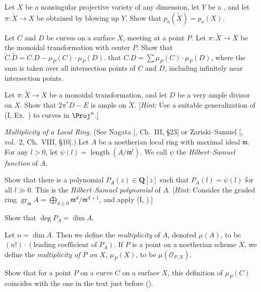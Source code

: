 {\Exercises
{\fontsize{9}{10.0}\selectfont\setlength{\parskip}{0pt}
\begin{description}[style=multiline,labelwidth=1.8em,leftmargin=2.15em,itemsep=3pt,topsep=0pt,parsep=0pt]
\item[\hypertarget{ex-V-3.1}{}3.1.] Let $X$ be a nonsingular projective variety of any dimension, let $Y$ be a , and let $\pi\colon\widetilde X\to X$ be obtained by blowing up $Y$. Show that $p_a(\widetilde X)=p_a(X)$.
\item[\hypertarget{ex-V-3.2}{}3.2.] Let $C$ and $D$ be curves on a surface $X$, meeting at a point $P$. Let $\pi\colon\widetilde X\to X$ be the monoidal transformation with center $P$. Show that $\widetilde C.\widetilde D=C.D-\mu_P(C)\cdot\mu_P(D)$.  that $C.D=\sum\mu_P(C)\cdot\mu_P(D)$, where the sum is taken over all intersection points of $C$ and $D$, including infinitely near intersection points.
\item[\hypertarget{ex-V-3.3}{}3.3.] Let $\pi\colon\widetilde X\to X$ be a monoidal transformation, and let $D$ be a very ample divisor on $X$. Show that $2\pi^*D-E$ is ample on $\widetilde X$. [\emph{Hint:} Use a suitable generalization of (I, Ex.~) to curves in $\Proj^n$.]
\item[\hypertarget{ex-V-3.4}{}3.4.] \emph{Multiplicity of a Local Ring.} (See Nagata [, Ch.~III, \S23] or Zariski--Samuel [, vol.~2, Ch.~VIII, \S10].) Let $A$ be a noetherian local ring with maximal ideal $\mathfrak m$. For any $l>0$, let $\psi(l)=\operatorname{length}(A/\mathfrak m^l)$. We call $\psi$ the \emph{Hilbert--Samuel function} of $A$.
\begin{parts}
\item Show that there is a polynomial $P_A(z)\in\mathbf Q[z]$ such that $P_A(l)=\psi(l)$ for all $l\gg0$. This is the \emph{Hilbert--Samuel polynomial} of $A$. [\emph{Hint:} Consider the graded ring $\operatorname{gr}_{\mathfrak m}A=\bigoplus_{d\ge0}\mathfrak m^d/\mathfrak m^{d+1}$, and apply (I, ).]
\item Show that $\deg P_A=\dim A$.
\item Let $n=\dim A$. Then we define the \emph{multiplicity} of $A$, denoted $\mu(A)$, to be $(n!)\cdot(\text{leading coefficient of }P_A)$. If $P$ is a point on a noetherian scheme $X$, we define the \emph{multiplicity of $P$ on $X$}, $\mu_P(X)$, to be $\mu(\mathcal O_{P,X})$.
\item Show that for a point $P$ on a curve $C$ on a surface $X$, this definition of $\mu_P(C)$ coincides with the one in the text just before ().

\end{parts}
\end{description}}}
